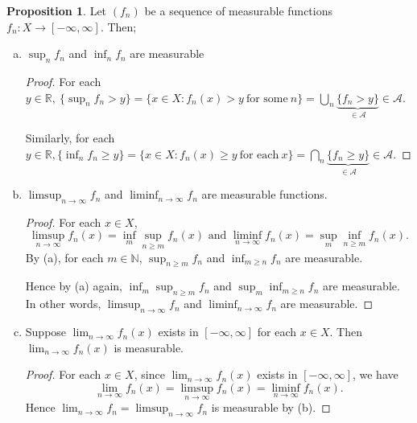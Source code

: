 \documentclass{article}
\newcommand{\R}{\mathbb{R}}
\newcommand{\N}{\mathbb{N}}
\theoremstyle{definition}
\newtheorem{proposition}[theorem]{Proposition}
\begin{document}
\begin{proposition} %
    Let $(f_n)$ be a sequence of measurable functions $f_n : X \to [-\infty,\infty]$. Then;
    
    \begin{enumerate}[(a)]
        \item $\sup_n f_n$ and $\inf_n f_n$ are measurable
        
        \begin{proof}
            For each $y \in \R,\ \{\sup_n f_n > y\} = \{x \in X : f_n(x) > y \ \text{for some}\ n\} = \bigcup_n \underbrace{\{f_n > y\}}_{\in \mathscr{A}} \in \mathscr{A}$.
            
            Similarly, for each $y \in \R, \{ \inf_n f_n \geq y\} = \{x \in X : f_n (x) \geq y \ \text{for each}\ x\} = \bigcap_n \underbrace{\{f_n \geq y\}}_{\in \mathscr{A}} \in \mathscr{A}$.
        \end{proof}
        
        \item $\limsup_{n\to\infty} f_n$ and $\liminf_{n\to\infty} f_n$ are measurable functions.
        \begin{proof}
            For each $x \in X$,
            \[
                \limsup_{n\to\infty} f_n(x) = \inf_m \sup_{n \geq m} f_n(x)
                \text{ and }\liminf_{n\to\infty} f_n(x) = \sup_m \inf_{n \geq m} f_n(x).
            \]
            By (a), for each $m \in \N$, $\sup_{n \geq m} f_n$ and $\inf_{m\geq n} f_n$ are measurable.
            
            Hence by (a) again, $\inf_m \sup_{n \geq m} f_n$ and $\sup_m \inf_{m \geq n} f_n$ are measurable. In other words, $\limsup_{n \to \infty} f_n$ and $\liminf_{n\to\infty} f_n$ are measurable.
        \end{proof}
        \item Suppose $\lim_{n\to\infty} f_n(x)$ exists in $[-\infty, \infty]$ for each $x \in X$. Then $\lim_{n\to\infty} f_n(x)$ is measurable.
        \begin{proof}
            For each $x \in X$, since $\lim_{n\to\infty} f_n(x)$ exists in $[-\infty, \infty]$, we have
            \[
                \lim_{n\to\infty} f_n(x) = \limsup_{n\to\infty} f_n(x) = \liminf_{n\to\infty} f_n(x).
            \]
            Hence $\lim_{n\to\infty} f_n = \limsup_{n\to\infty} f_n$ is measurable by (b).
        \end{proof}
    \end{enumerate}
\end{proposition}
\end{document}
